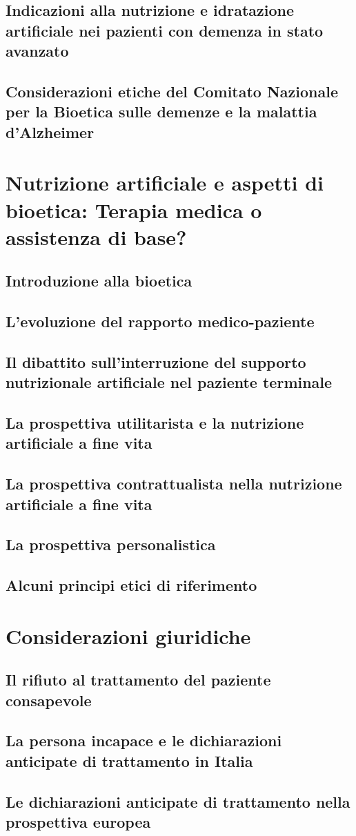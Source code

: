 \documentclass[11pt,a4paper,oneside]{book}
\begin{document}
\section{Indicazioni alla nutrizione e idratazione artificiale nei pazienti con demenza in stato avanzato}
\section{Considerazioni etiche del Comitato Nazionale per la Bioetica sulle demenze e la malattia d'Alzheimer}

\chapter{Nutrizione artificiale e aspetti di bioetica: Terapia medica o assistenza di base?}
\section{Introduzione alla bioetica}
\section{L'evoluzione del rapporto medico-paziente}
\section{Il dibattito sull'interruzione del supporto nutrizionale artificiale nel paziente terminale}
\section{La prospettiva utilitarista e la nutrizione artificiale a fine vita}
\section{La prospettiva contrattualista nella nutrizione artificiale a fine vita}
\section{La prospettiva personalistica }
\section{Alcuni principi etici di riferimento }

\chapter{Considerazioni giuridiche}
\section{ Il rifiuto al trattamento del paziente consapevole }
\section{La persona incapace e le dichiarazioni anticipate di trattamento in Italia}
\section{Le dichiarazioni anticipate di trattamento nella prospettiva europea}

\nocite{*} 
\end{document}
